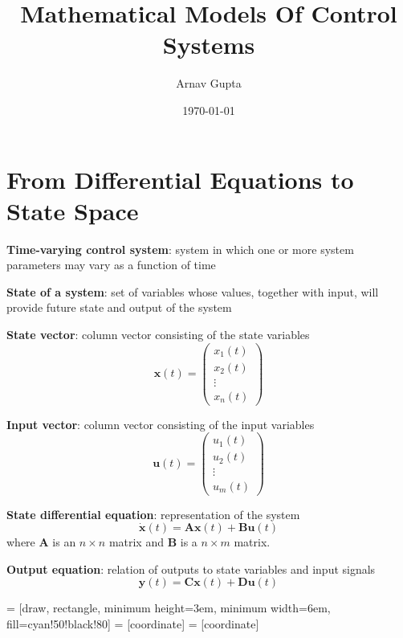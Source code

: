 \documentclass[11pt]{article}
\author{Arnav Gupta}
\date{\today}
\title{Mathematical Models Of Control Systems}
\begin{document}
\maketitle
\tableofcontents

\section{From Differential Equations to State Space}
\label{sec:org4399ed6}
\textbf{Time-varying control system}: system in which one or more system parameters
may vary as a function of time

\textbf{State of a system}: set of variables whose values, together with input,
will provide future state and output of the system

\textbf{State vector}: column vector consisting of the state variables
$$
\mathbf{x}(t) = \begin{pmatrix} x_{1}(t) \\ x_{2}(t) \\ \vdots \\ x_{n}(t) \end{pmatrix}
$$

\textbf{Input vector}: column vector consisting of the input variables
$$
\mathbf{u}(t) = \begin{pmatrix} u_{1}(t) \\ u_{2}(t) \\ \vdots \\ u_{m}(t) \end{pmatrix}
$$

\textbf{State differential equation}: representation of the system
$$
\dot{\mathbf{x}}(t) = \mathbf{Ax}(t) + \mathbf{Bu}(t)
$$
where \(\mathbf{A}\) is an \(n \times n\) matrix and \(\mathbf{B}\) is a \(n \times m\) matrix.

\textbf{Output equation}: relation of outputs to state variables and input signals
$$
\mathbf{y}(t) = \mathbf{Cx}(t) + \mathbf{Du}(t)
$$

 = [draw, rectangle, minimum height=3em, minimum width=6em, fill=cyan!50!black!80]
 = [coordinate]
 = [coordinate]
\begin{center}
\end{center}
\end{document}
